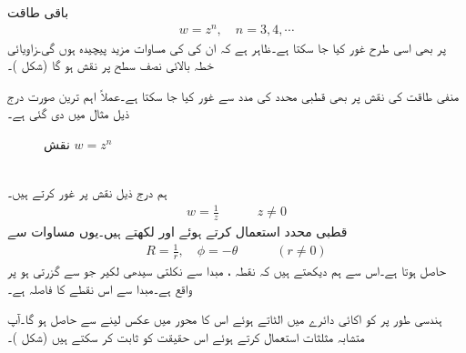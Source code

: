 باقی طاقت
\begin{align}
w=z^n,\quad n=3,4,\cdots
\end{align}
پر بھی اسی طرح غور کیا جا سکتا ہے۔ظاہر ہے کہ ان کی  کی مساوات مزید پیچیدہ ہوں گی۔زاویائی خطہ  بالائی نصف  سطح پر نقش ہو گا (شکل )۔

منفی طاقت کی نقش  پر بھی قطبی محدد کی مدد سے غور کیا جا سکتا ہے۔عملاً اہم ترین صورت درج ذیل مثال میں دی گئی ہے۔
\begin{figure}
\centering
\begin{subfigure}{0.30\textwidth}
\centering
{}
\end{subfigure}\hfill
\begin{subfigure}{0.60\textwidth}
\centering
{}
\end{subfigure}
\caption{نقش $w=z^n\,$}
\label{شکل_نقش_عمومی_طاقت}
\end{figure}

\quad {}\\
ہم درج ذیل نقش پر غور کرتے ہیں۔
\begin{align}\label{مساوات_نقش_الٹ_جانا_الف}
w=\frac{1}{z}\quad \quad \quad z\ne 0
\end{align}
قطبی محدد استعمال کرتے ہوئے  اور  لکھتے ہیں۔یوں مساوات  سے
\begin{align}
R=\frac{1}{r},\quad \phi=-\theta\quad \quad \quad (r\ne 0)
\end{align}
حاصل ہوتا ہے۔اس سے ہم دیکھتے ہیں کہ نقطہ ، مبدا سے نکلتی سیدھی لکیر جو  سے گزرتی ہو پر واقع ہے۔مبدا سے اس نقطے کا فاصلہ  ہے۔

ہندسی طور پر  کو اکائی دائرے میں الٹاتے ہوئے اس کا محور  میں عکس لینے سے   حاصل ہو گا۔آپ متشابہ مثلثات  استعمال کرتے ہوئے اس حقیقت کو ثابت کر سکتے ہیں (شکل  )۔

